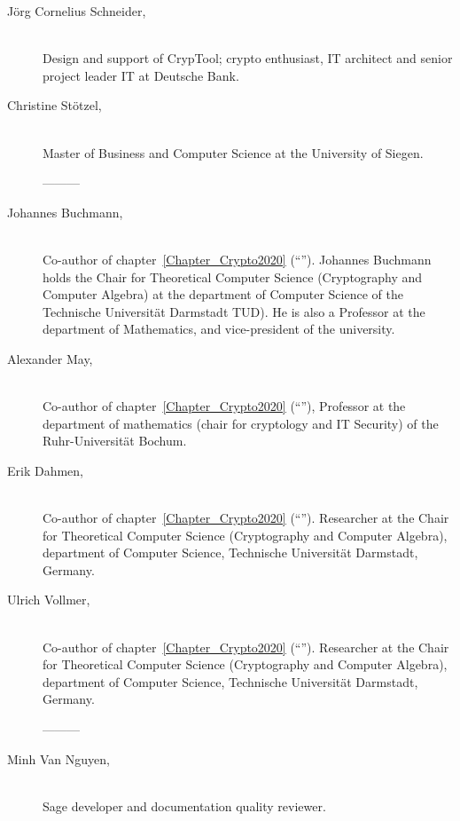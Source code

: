 \begin{description}
\item[J\"org Cornelius Schneider,] \mbox{}\\
Design and support of CrypTool; crypto enthusiast, IT architect and
senior project leader IT at Deutsche Bank.

\item[Christine St\"otzel,] \mbox{}\\
Master of Business and Computer Science at the University of Siegen.

---------

\item[Johannes Buchmann,] \mbox{}\\
Co-author of chapter~\ref{Chapter_Crypto2020} (``'').
Johannes Buchmann holds the Chair for Theoretical Computer Science (Cryptography
and Computer Algebra) at the department of Computer Science of the Technische
Universit\"at Darmstadt TUD).  He is also a Professor at the department of Mathematics, and vice-president of the university.

\item[Alexander May,] \mbox{}\\
Co-author of chapter~\ref{Chapter_Crypto2020} (``''), 
Professor at the department of mathematics (chair for cryptology and
IT Security) of the Ruhr-Universit\"at Bochum.


\item[Erik Dahmen,] \mbox{}\\
Co-author of chapter~\ref{Chapter_Crypto2020} (``''). 
Researcher at the Chair for Theoretical Computer Science (Cryptography and
Computer Algebra), department of Computer Science, Technische Universit\"at
Darmstadt, Germany.

\item[Ulrich Vollmer,] \mbox{}\\
Co-author of chapter~\ref{Chapter_Crypto2020} (``'').
Researcher at the Chair for Theoretical Computer Science (Cryptography and
Computer Algebra), department of Computer Science, Technische Universit\"at
Darmstadt, Germany.

---------

\item[Minh Van Nguyen,] \mbox{}\\
Sage developer and documentation quality reviewer.



\end{description}

